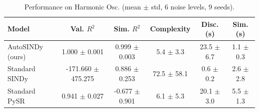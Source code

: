 \begin{table}[htbp]
\centering
\small
\renewcommand{\arraystretch}{1.2}
\caption{Performance on Harmonic Osc. (mean $\pm$ std, 6 noise levels, 9 seeds).}
\label{tab:autosindy_harmonic_oscillator}
\begin{tabular}{lccccc}
\toprule
Model & Val. $R^2$ & Sim. $R^2$ & Complexity & Disc. (s) & Sim. (s) \\
\midrule
AutoSINDy (ours) & 1.000 $\pm$ 0.001 & 0.999 $\pm$ 0.003 & 5.4 $\pm$ 3.3 & 23.5 $\pm$ 6.7 & 1.1 $\pm$ 0.3 \\
Standard SINDy & -171.660 $\pm$ 475.275 & 0.886 $\pm$ 0.253 & 72.5 $\pm$ 58.1 & 0.6 $\pm$ 0.2 & 2.6 $\pm$ 2.8 \\
Standard PySR & 0.941 $\pm$ 0.027 & -0.677 $\pm$ 0.901 & 6.1 $\pm$ 5.3 & 20.1 $\pm$ 3.0 & 5.5 $\pm$ 1.3 \\
\bottomrule
\end{tabular}
\end{table}